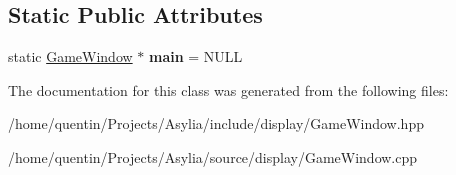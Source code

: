 \subsection*{Static Public Attributes}
\begin{DoxyCompactItemize}
\item 
\hypertarget{classGameWindow_a339481fc919a03992d10dd3d2b7d3965}{static \hyperlink{classGameWindow}{Game\-Window} $\ast$ {\bfseries main} = N\-U\-L\-L}\label{classGameWindow_a339481fc919a03992d10dd3d2b7d3965}

\end{DoxyCompactItemize}


The documentation for this class was generated from the following files\-:\begin{DoxyCompactItemize}
\item 
/home/quentin/\-Projects/\-Asylia/include/display/Game\-Window.\-hpp\item 
/home/quentin/\-Projects/\-Asylia/source/display/Game\-Window.\-cpp\end{DoxyCompactItemize}
